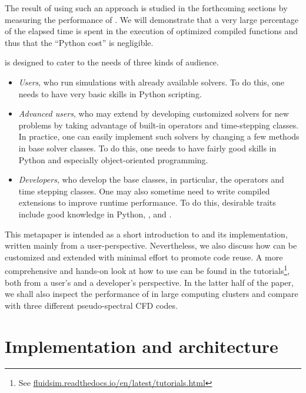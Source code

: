 The result of using such an approach is studied in the forthcoming sections by
measuring the performance of .
%
We will demonstrate that a very large percentage of the elapsed time is spent in
the execution of optimized compiled functions and thus that the ``Python cost'' is
negligible.


 is designed to cater to the needs of three kinds of audience.
\begin{itemize}
\item \emph{Users}, who run simulations with already available solvers. To do
this, one needs to have very basic skills in Python scripting.
\item \emph{Advanced users}, who may extend  by developing
customized solvers for new problems by taking advantage of built-in operators and
time-stepping classes.  In practice, one can easily implement such solvers by
changing a few methods in base solver classes.  To do this, one needs to have
fairly good skills in Python and especially object-oriented programming.
\item \emph{Developers}, who develop the base classes, in particular, the
operators and time stepping classes.  One may also sometime need to write compiled
extensions to improve runtime performance. To do this, desirable traits include
good knowledge in Python, \Numpy,  and .
\end{itemize}

This metapaper is intended as a short introduction to  and its
implementation, written mainly from a user-perspective. Nevertheless, we also discuss how
 can be customized and extended with minimal effort to promote code
reuse.
%
A more comprehensive and hands-on look at how to use  can be found
in the tutorials\footnote{See
\href{https://fluidsim.readthedocs.io/en/latest/tutorials.html}{fluidsim.readthedocs.io/en/latest/tutorials.html}},
both from a user's and a developer's perspective.
%
In the latter half of the paper, we shall also inspect the performance of
 in large computing clusters and compare  with three
different pseudo-spectral CFD codes.

\section{Implementation and architecture}



